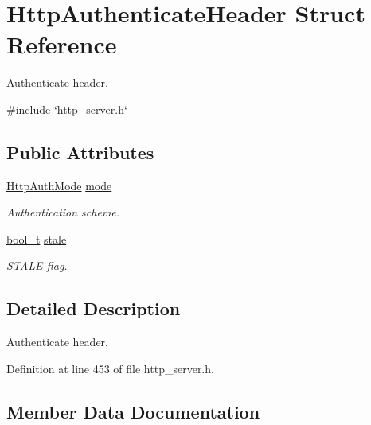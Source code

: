 \hypertarget{structHttpAuthenticateHeader}{}\section{Http\+Authenticate\+Header Struct Reference}
\label{structHttpAuthenticateHeader}


Authenticate header.  




{\ttfamily \#include \char`\"{}http\+\_\+server.\+h\char`\"{}}

\subsection*{Public Attributes}
\begin{DoxyCompactItemize}
\item 
\hyperlink{http__common_8h_ad435f9e57a3351beaec6fc809eff4f31}{Http\+Auth\+Mode} \hyperlink{structHttpAuthenticateHeader_a105132779592f2bcc0984060b7890eba}{mode}
\begin{DoxyCompactList}\small\item\em Authentication scheme. \end{DoxyCompactList}\item 
\hyperlink{compiler__port_8h_a812d16e5494522586b3784e55d479912}{bool\+\_\+t} \hyperlink{structHttpAuthenticateHeader_a684724ab0988a6e8588adb71b4c996b7}{stale}
\begin{DoxyCompactList}\small\item\em S\+T\+A\+LE flag. \end{DoxyCompactList}\end{DoxyCompactItemize}


\subsection{Detailed Description}
Authenticate header. 

Definition at line 453 of file http\+\_\+server.\+h.



\subsection{Member Data Documentation}
\mbox{\label{structHttpAuthenticateHeader_a105132779592f2bcc0984060b7890eba}} 
